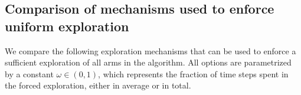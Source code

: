 \subsection{Comparison of mechanisms used to enforce uniform exploration}\label{sec:6:exploringDifferentForcedExplorationMechanisms}

%

We compare the following exploration mechanisms that can be used to enforce a sufficient exploration of all arms in the \GLRklUCB{} algorithm.
All options are parametrized by a constant $\omega\in(0,1)$, which represents the fraction of time steps spent in the forced exploration, either in average or in total.

